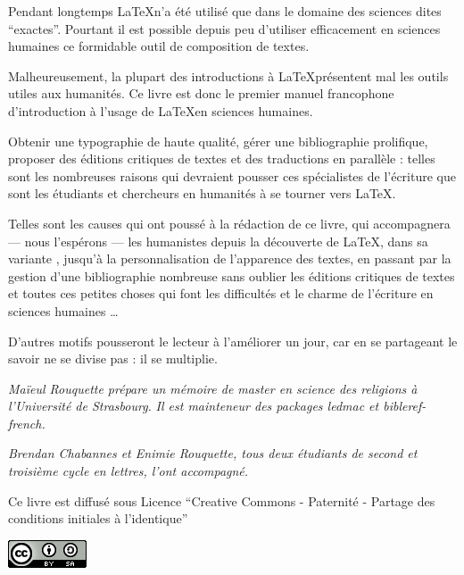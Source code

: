 \thispagestyle{empty}

Pendant longtemps \LaTeX n'a été utilisé que dans le domaine des sciences dites \enquote{exactes}.
Pourtant il est possible depuis peu d'utiliser efficacement en sciences humaines ce formidable outil de composition de textes.

Malheureusement, la plupart des introductions à \LaTeX présentent mal les outils utiles aux humanités. Ce livre est donc le premier manuel francophone d'introduction à l'usage de \LaTeX en sciences humaines.

Obtenir une typographie de haute qualité, gérer une bibliographie prolifique, proposer des éditions critiques de textes et des traductions en parallèle : telles sont les nombreuses raisons qui devraient pousser ces spécialistes de l'écriture que sont les étudiants et chercheurs en humanités à se tourner vers \LaTeX.

Telles sont les causes qui ont poussé à la rédaction de ce livre, qui accompagnera --- nous l'espérons --- les humanistes depuis la découverte de \LaTeX, dans sa variante \XeLaTeX, jusqu'à la personnalisation de l'apparence des textes, en passant par la gestion d'une bibliographie nombreuse sans oublier les éditions critiques de textes et toutes ces petites choses qui font les difficultés et le charme de l'écriture en sciences humaines \ldots

D'autres motifs pousseront le lecteur à l'améliorer un jour, car en se partageant le savoir ne se divise pas : il se multiplie.

\vspace{4ex}

\scriptsize
\emph{
Maïeul Rouquette prépare un mémoire de master en science des religions à l'Université de Strasbourg.} 
\emph{Il est mainteneur des packages \emph{ledmac} et \emph{bibleref-french}.}


\emph{Brendan Chabannes et Enimie Rouquette, tous deux étudiants  de second et troisième cycle en lettres, l'ont accompagné.}

\normalsize

\vspace{4ex}
Ce livre est diffusé sous Licence \enquote{Creative Commons - Paternité - Partage des conditions initiales à l'identique}

\vspace{2ex}
 \raggedleft\includegraphics[height=3ex]{images/cc.png}
